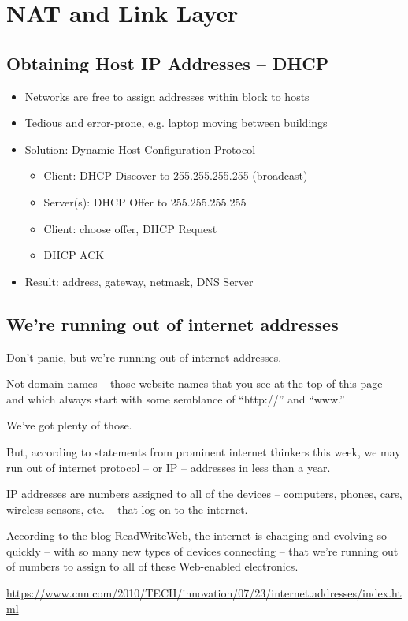 \section{NAT and Link Layer}
\subsection{Obtaining Host IP Addresses -- DHCP}
\begin{itemize}[nosep]
    \item Networks are free to assign addresses within block to hosts
    \item Tedious and error-prone, e.g. laptop moving between buildings
    \item Solution: Dynamic Host Configuration Protocol
          \begin{itemize}[nosep]
              \item Client: DHCP Discover to 255.255.255.255 (broadcast)
              \item Server(s): DHCP Offer to 255.255.255.255
              \item Client: choose offer, DHCP Request
              \item DHCP ACK
          \end{itemize}
    \item Result: address, gateway, netmask, DNS Server
\end{itemize}

\subsection{We're running out of internet addresses}
\begin{tcolorbox}[colframe=red!40!white,colback=yellow!20,title=We're running out of internet addresses]
    Don't panic, but we're running out of internet addresses.

    Not domain names -- those website names that you see at the top of this page and which always start with some semblance of ``http://'' and ``www.''

    We've got plenty of those.

    But, according to statements from prominent internet thinkers this week, we may run out of internet protocol -- or IP -- addresses in less than a year.

    IP addresses are numbers assigned to all of the devices -- computers, phones, cars, wireless sensors, etc. -- that log on to the internet.

    According to the blog ReadWriteWeb, the internet is changing and evolving so quickly -- with so many new types of devices connecting -- that we're running out of numbers to assign to all of these Web-enabled electronics.

    \url{https://www.cnn.com/2010/TECH/innovation/07/23/internet.addresses/index.html}
\end{tcolorbox}
